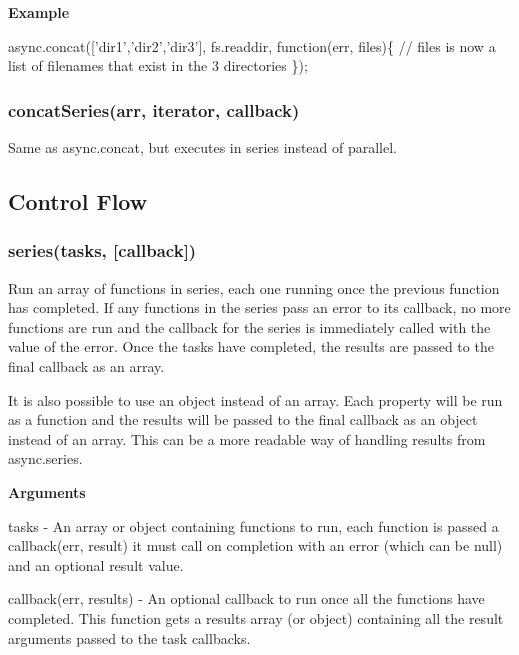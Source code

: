 {\bfseries Example}


\begin{DoxyCode}
async.concat(['dir1','dir2','dir3'], fs.readdir, function(err, files)\{
    // files is now a list of filenames that exist in the 3 directories
\});
\end{DoxyCode}
 



\label{_concatSeries}%
 \subsubsection*{concat\+Series(arr, iterator, callback)}

Same as async.\+concat, but executes in series instead of parallel.

\subsection*{Control Flow}

\label{_series}%
 \subsubsection*{series(tasks, \mbox{[}callback\mbox{]})}

Run an array of functions in series, each one running once the previous function has completed. If any functions in the series pass an error to its callback, no more functions are run and the callback for the series is immediately called with the value of the error. Once the tasks have completed, the results are passed to the final callback as an array.

It is also possible to use an object instead of an array. Each property will be run as a function and the results will be passed to the final callback as an object instead of an array. This can be a more readable way of handling results from async.\+series.

{\bfseries Arguments}


\begin{DoxyItemize}
\item tasks -\/ An array or object containing functions to run, each function is passed a callback(err, result) it must call on completion with an error (which can be null) and an optional result value.
\item callback(err, results) -\/ An optional callback to run once all the functions have completed. This function gets a results array (or object) containing all the result arguments passed to the task callbacks.
\end{DoxyItemize}

